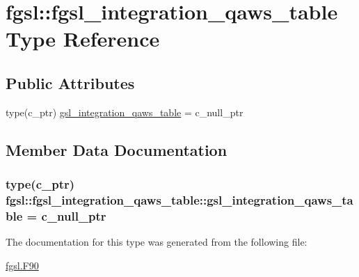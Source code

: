 \hypertarget{structfgsl_1_1fgsl__integration__qaws__table}{\section{fgsl\-:\-:fgsl\-\_\-integration\-\_\-qaws\-\_\-table Type Reference}
\label{structfgsl_1_1fgsl__integration__qaws__table}
}
\subsection*{Public Attributes}
\begin{DoxyCompactItemize}
\item 
type(c\-\_\-ptr) \hyperlink{structfgsl_1_1fgsl__integration__qaws__table_af47cc732c480000d09979d48d978fd8e}{gsl\-\_\-integration\-\_\-qaws\-\_\-table} = c\-\_\-null\-\_\-ptr
\end{DoxyCompactItemize}


\subsection{Member Data Documentation}
\hypertarget{structfgsl_1_1fgsl__integration__qaws__table_af47cc732c480000d09979d48d978fd8e}{
\subsubsection[{gsl\-\_\-integration\-\_\-qaws\-\_\-table}]{\setlength{\rightskip}{0pt plus 5cm}type(c\-\_\-ptr) fgsl\-::fgsl\-\_\-integration\-\_\-qaws\-\_\-table\-::gsl\-\_\-integration\-\_\-qaws\-\_\-table = c\-\_\-null\-\_\-ptr}}\label{structfgsl_1_1fgsl__integration__qaws__table_af47cc732c480000d09979d48d978fd8e}


The documentation for this type was generated from the following file\-:\begin{DoxyCompactItemize}
\item 
\hyperlink{fgsl_8F90}{fgsl.\-F90}\end{DoxyCompactItemize}
